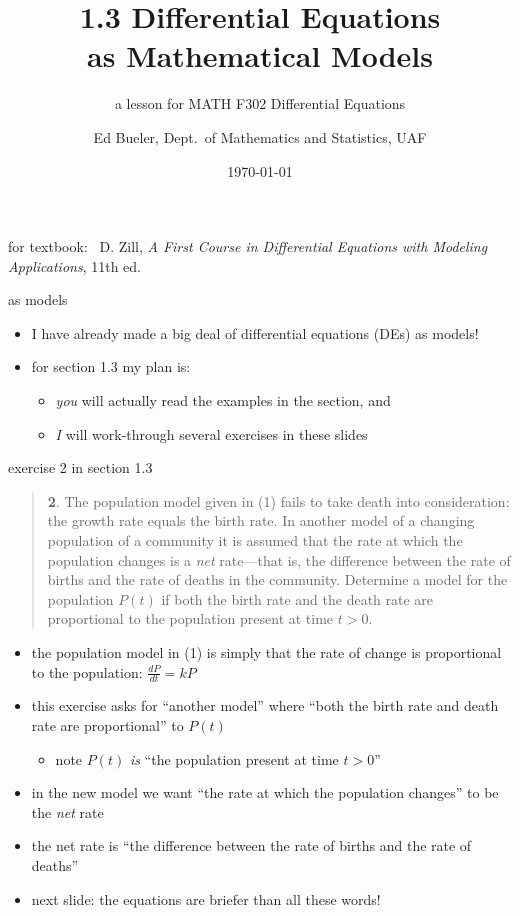 \documentclass{beamer}
\title{1.3 Differential Equations \\ as Mathematical Models}
\subtitle{a lesson for MATH F302 Differential Equations}
\author{Ed Bueler, Dept.~of Mathematics and Statistics, UAF}
\date{\tiny \today}
\begin{document}


\begin{frame}
\titlepage

\centerline{\tiny for textbook: \, D. Zill, \emph{A First Course in Differential Equations with Modeling Applications}, 11th ed.}
\end{frame}


\begin{frame}{as models}

\begin{itemize}
\item I have already made a big deal of differential equations (DEs) as models!
\item for section 1.3 my plan is:
    \begin{itemize}
    \item \emph{you} will actually read the examples in the section, and
    \item \emph{I} will work-through several exercises in these slides
    \end{itemize}
\end{itemize}
\end{frame}

\begin{frame}{exercise 2 in section 1.3}

\scriptsize
\begin{quotation}
\noindent \textbf{2}.  The population model given in (1) fails to take death into consideration: the growth rate equals the birth rate.  In another model of a changing population of a community it is assumed that the rate at which the population changes is a \emph{net} rate---that is, the difference between the rate of births and the rate of deaths in the community.  Determine a model for the population $P(t)$ if both the birth rate and the death rate are proportional to the population present at time $t>0$.
\end{quotation}

\small
\vspace{-3mm}

\begin{itemize}
\item the population model in (1) is simply that the rate of change is proportional to the population: $\frac{dP}{dt} = k P$
\item this exercise asks for ``another model'' where ``both the birth rate and death rate are proportional'' to $P(t)$
    \begin{itemize}
    \item note $P(t)$ \emph{is} ``the population present at time $t>0$''
    \end{itemize}
\item in the new model we want ``the rate at which the population changes'' to be the \emph{net} rate
\item the net rate is ``the difference between the rate of births and the rate of deaths''
\item next slide: the equations are briefer than all these words!
\end{itemize}
\end{frame}
\end{document}
